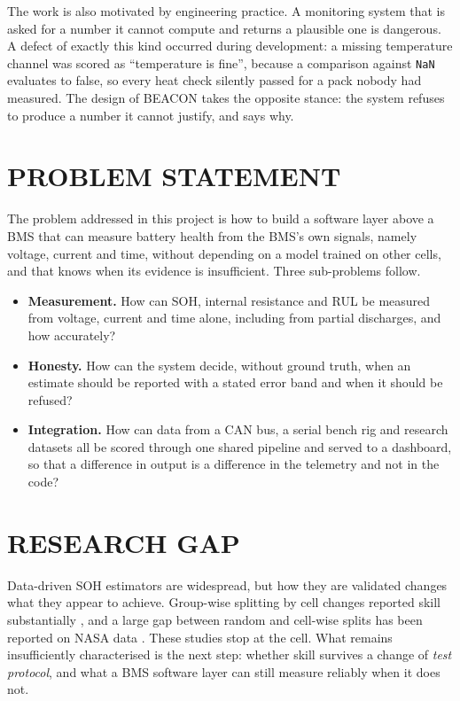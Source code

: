 The work is also motivated by engineering practice. A monitoring system that is asked for a number it cannot compute and returns a plausible one is dangerous. A defect of exactly this kind occurred during development: a missing temperature channel was scored as ``temperature is fine'', because a comparison against \texttt{NaN} evaluates to false, so every heat check silently passed for a pack nobody had measured. The design of BEACON takes the opposite stance: the system refuses to produce a number it cannot justify, and says why.

\section{PROBLEM STATEMENT}

The problem addressed in this project is how to build a software layer above a BMS that can measure battery health from the BMS's own signals, namely voltage, current and time, without depending on a model trained on other cells, and that knows when its evidence is insufficient. Three sub-problems follow.

\begin{itemize}
    \item \textbf{Measurement.} How can SOH, internal resistance and RUL be measured from voltage, current and time alone, including from partial discharges, and how accurately?
    \item \textbf{Honesty.} How can the system decide, without ground truth, when an estimate should be reported with a stated error band and when it should be refused?
    \item \textbf{Integration.} How can data from a CAN bus, a serial bench rig and research datasets all be scored through one shared pipeline and served to a dashboard, so that a difference in output is a difference in the telemetry and not in the code?
\end{itemize}

\section{RESEARCH GAP}

Data-driven SOH estimators are widespread, but how they are validated changes what they appear to achieve. Group-wise splitting by cell changes reported skill substantially \cite{maher2025}, and a large gap between random and cell-wise splits has been reported on NASA data \cite{le2026}. These studies stop at the cell. What remains insufficiently characterised is the next step: whether skill survives a change of \emph{test protocol}, and what a BMS software layer can still measure reliably when it does not.


